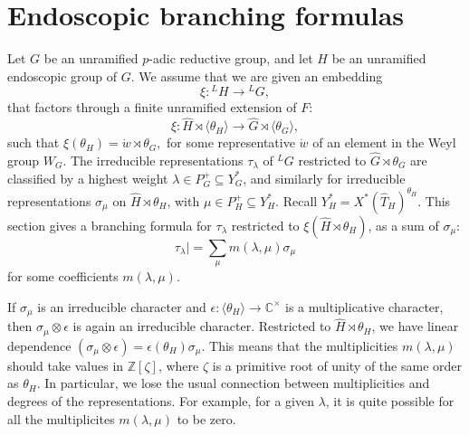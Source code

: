 
% 
% 


\newcommand{\XX}[1]{{\it  [To do: #1]}}
\newcommand{\ring}[1]{\mathbb{#1}}
\newcommand{\g}[1]{\langle{#1}\rangle}
\def\op#1{{\operatorname{#1}}}
\def\inv{\op{inv}}
\def\dom{P^+}
\def\Q{{\ring{Q}}}
\def\card{\op{card}}
\def\CSrho{[W_S\backslash C_\rho]}

\def\C{\mathcal C}
\def\N{\mathcal N}
\def\H{\mathcal H}
\def\M{\mathcal M}
\def\T{\mathcal T}

\def\n{{\mathfrak n}}
\def\Frob{\op{Frob}}
\def\dotw{\dot w}

\def\libel#1{{\text{\sc [#1]~}}\label{#1}}
\def\rif#1{(\ref{#1}-{\text{\sc #1})}}



\newpage
\section{Endoscopic branching formulas}\label{sec:branch}

Let $G$ be an unramified $p$-adic reductive group, and let $H$ be an unramified endoscopic
group of $G$.  We assume that we are given an embedding
\[
\xi:{}^LH\to {}^LG,
\]
that factors through a finite unramified extension of $F$:
\[
\xi:\hat H\rtimes \g{\theta_H}\to \hat G\rtimes \g{\theta_G},
\]
such that $\xi(\theta_H) = \dotw  \rtimes \theta_G,$
for some representative $\dotw $ of an element in the Weyl group $W_G$.
The irreducible representations $\tau_\lambda$ of ${}^LG$ restricted to $\hat G\rtimes\theta_G$ are classified
by a highest weight $\lambda\in P^+_G\subseteq Y^*_G$, and similarly for irreducible representations $\sigma_\mu$
on $\hat H\rtimes \theta_H$, with $\mu\in P^+_H\subseteq Y^*_H$.  Recall $Y^*_H = X^*(\hat T_H)^{\theta_H}$.
This section gives a  branching formula for $\tau_\lambda$ restricted to $\xi(\hat H\rtimes\theta_H)$,
as a sum of $\sigma_\mu$:
\[
\tau_\lambda| = \sum_\mu m(\lambda,\mu) \sigma_\mu
\]
for some coefficients $m(\lambda,\mu)$.  

If $\sigma_\mu$ is an irreducible character and $\epsilon:\g{\theta_H}\to \ring{C}^\times$ is a multiplicative character,
then $\sigma_\mu\otimes \epsilon$ is again an irreducible character.  Restricted to $\hat H\rtimes\theta_H$, we have
 linear dependence $(\sigma_\mu\otimes\epsilon) = \epsilon(\theta_H) \sigma_\mu $.
This means that the multiplicities $m(\lambda,\mu)$ should take values in $\ring{Z}[\zeta]$, where $\zeta$ is a primitive
root of unity of the same order as $\theta_H$.  In particular, 
we lose the usual connection between multiplicities and degrees of the representations. For example,
for a given $\lambda$,
it is quite possible for all the multiplicites $m(\lambda,\mu)$ to be zero.


